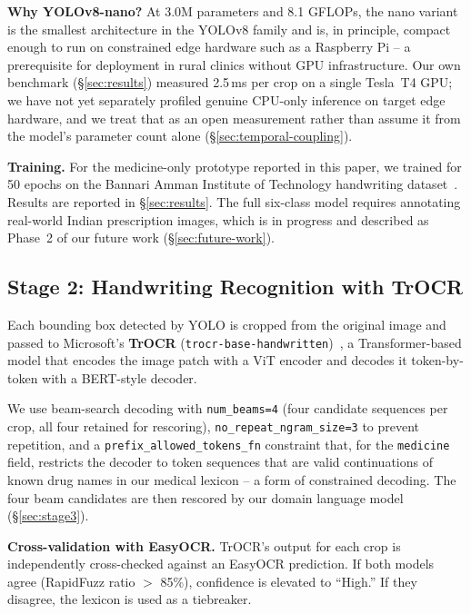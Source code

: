\documentclass[conference]{IEEEtran}
\begin{document}
\textbf{Why YOLOv8-nano?} At 3.0M parameters and 8.1 GFLOPs, the nano variant is the smallest architecture in the YOLOv8 family and is, in principle, compact enough to run on constrained edge hardware such as a Raspberry Pi -- a prerequisite for deployment in rural clinics without GPU infrastructure. Our own benchmark (\S\ref{sec:results}) measured 2.5\,ms per crop on a single Tesla~T4 GPU; we have not yet separately profiled genuine CPU-only inference on target edge hardware, and we treat that as an open measurement rather than assume it from the model's parameter count alone (\S\ref{sec:temporal-coupling}).

\textbf{Training.} For the medicine-only prototype reported in this paper, we trained for 50 epochs on the Bannari Amman Institute of Technology handwriting dataset~\cite{bannari2023handwritten}. Results are reported in \S\ref{sec:results}. The full six-class model requires annotating real-world Indian prescription images, which is in progress and described as Phase~2 of our future work (\S\ref{sec:future-work}).

\subsection{Stage 2: Handwriting Recognition with TrOCR}
\label{sec:stage2}

Each bounding box detected by YOLO is cropped from the original image and passed to Microsoft's \textbf{TrOCR} (\texttt{trocr-base-handwritten})~\cite{li2023trocr}, a Transformer-based model that encodes the image patch with a ViT encoder and decodes it token-by-token with a BERT-style decoder.

We use beam-search decoding with \texttt{num\_beams=4} (four candidate sequences per crop, all four retained for rescoring), \texttt{no\_repeat\_ngram\_size=3} to prevent repetition, and a \texttt{prefix\_allowed\_tokens\_fn} constraint that, for the \texttt{medicine} field, restricts the decoder to token sequences that are valid continuations of known drug names in our medical lexicon -- a form of constrained decoding. The four beam candidates are then rescored by our domain language model (\S\ref{sec:stage3}).

\textbf{Cross-validation with EasyOCR.} TrOCR's output for each crop is independently cross-checked against an EasyOCR prediction. If both models agree (RapidFuzz ratio $>$ 85\%), confidence is elevated to ``High.'' If they disagree, the lexicon is used as a tiebreaker.
\end{document}
